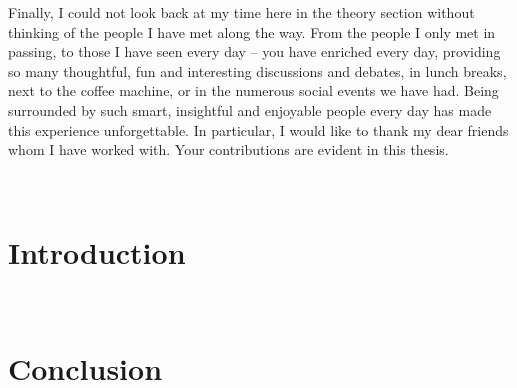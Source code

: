 \documentclass[UKenglish]{uiomaster/uiomasterthesis}
\begin{document}
Finally, I could not look back at my time here in the theory section without thinking of the people I have met along the way.
From the people I only met in passing, to those I have seen every day -- you have enriched every day, providing so many thoughtful, fun and interesting discussions and debates, in lunch breaks, next to the coffee machine, or in the numerous social events we have had.
Being surrounded by such smart, insightful and enjoyable people every day has made this experience unforgettable.
In particular, I would like to thank my dear friends whom I have worked with.
Your contributions are evident in this thesis.



\tableofcontents

\listoffigures

\listoftables

\mainmatter\

\chapter*{Introduction} 













\backmatter\
\chapter*{Conclusion} 


\appendix
\appendixpage\


{}

\end{document}
